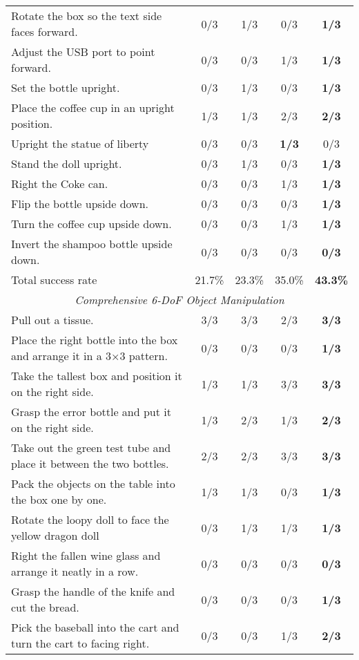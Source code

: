 \begin{table*}[t!]
{\begin{tabular}{lcccc}
    Rotate the box so the text side faces forward. & 0/3 & 1/3 & 0/3 & \textbf{1/3}\\
    Adjust the USB port to point forward. & 0/3 & 0/3 & 1/3 & \textbf{1/3}\\
    Set the bottle upright. & 0/3 & 1/3 & 0/3 & \textbf{1/3}\\
    Place the coffee cup in an upright position. & 1/3 & 1/3 & 2/3 & \textbf{2/3}\\
    Upright the statue of liberty& 0/3 & 0/3 & \textbf{1/3} & 0/3\\
    Stand the doll upright. & 0/3 & 1/3 & 0/3 & \textbf{1/3}\\
    Right the Coke can. & 0/3 & 0/3 & 1/3 & \textbf{1/3}\\
    Flip the bottle upside down. & 0/3 & 0/3 & 0/3 & \textbf{1/3}\\
    Turn the coffee cup upside down. & 0/3 & 0/3 & 1/3 & \textbf{1/3}\\
    Invert the shampoo bottle upside down. & 0/3 & 0/3 & 0/3 & \textbf{0/3}\\
    Total success rate& 21.7\% & 23.3\% & 35.0\% & \textbf{43.3\%} \\
    \midrule
    \multicolumn{5}{c}{\textit{Comprehensive 6-DoF Object Manipulation}}\\
    \midrule
    Pull out a tissue.& 3/3 & 3/3 & 2/3 & \textbf{3/3}\\
    Place the right bottle into the
    box and arrange it in a 3×3 pattern. & 0/3 & 0/3 & 0/3 & \textbf{1/3}\\
    Take the tallest box and position it on the right side. & 1/3 & 1/3 & 3/3 & \textbf{3/3}\\
    Grasp the error bottle and put it on the right side. & 1/3 & 2/3 & 1/3 & \textbf{2/3} \\
    Take out the green test tube and place it between the two bottles. & 2/3 & 2/3 & 3/3 & \textbf{3/3}\\
    Pack the objects on the table into the box one by one. & 1/3 & 1/3 & 0/3 & \textbf{1/3}\\
    Rotate the loopy doll to face the yellow dragon doll & 0/3 & 1/3 & 1/3 & \textbf{1/3}\\
    Right the fallen wine glass and arrange it neatly in a row. & 0/3 & 0/3 & 0/3 & \textbf{0/3}\\
    Grasp the handle of the knife and cut the bread.& 0/3 & 0/3 & 0/3 & \textbf{1/3}\\
    Pick the baseball into the cart and turn the cart to facing right. & 0/3 & 0/3 & 1/3 & \textbf{2/3}\\

\end{tabular}}
\end{table*}
